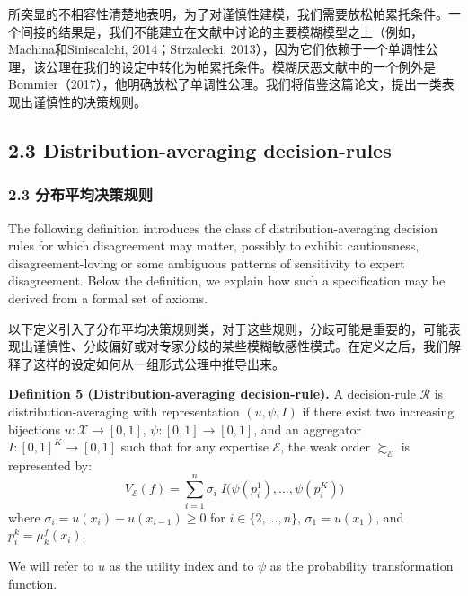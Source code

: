 \documentclass[12pt,a4paper]{article}
\newenvironment{original}
  {\par\noindent\ignorespaces}
  {\par}
\newenvironment{translation}
  {\par\noindent{\color{transblue}\ignorespaces}}
  {\par\medskip}
\begin{document}
\begin{translation}
所突显的不相容性清楚地表明，为了对谨慎性建模，我们需要放松帕累托条件。一个间接的结果是，我们不能建立在文献中讨论的主要模糊模型之上（例如，Machina和Siniscalchi, 2014；Strzalecki, 2013），因为它们依赖于一个单调性公理，该公理在我们的设定中转化为帕累托条件。模糊厌恶文献中的一个例外是Bommier（2017），他明确放松了单调性公理。我们将借鉴这篇论文，提出一类表现出谨慎性的决策规则。
\end{translation}

\subsection{2.3 Distribution-averaging decision-rules}
{\color{transblue}\subsubsection*{2.3 分布平均决策规则}}

\begin{original}
The following definition introduces the class of distribution-averaging decision rules for which disagreement may matter, possibly to exhibit cautiousness, disagreement-loving or some ambiguous patterns of sensitivity to expert disagreement. Below the definition, we explain how such a specification may be derived from a formal set of axioms.
\end{original}

\begin{translation}
以下定义引入了分布平均决策规则类，对于这些规则，分歧可能是重要的，可能表现出谨慎性、分歧偏好或对专家分歧的某些模糊敏感性模式。在定义之后，我们解释了这样的设定如何从一组形式公理中推导出来。
\end{translation}

\begin{original}
\textbf{Definition 5 (Distribution-averaging decision-rule).} A decision-rule $\mathcal{R}$ is distribution-averaging with representation $(u, \psi, I)$ if there exist two increasing bijections $u: \mathcal{X} \to [0,1]$, $\psi: [0,1] \to [0,1]$, and an aggregator $I: [0,1]^{K} \to [0,1]$ such that for any expertise $\mathcal{E}$, the weak order $\succsim_{\mathcal{E}}$ is represented by:
\[
V_{\mathcal{E}}(f) = \sum_{i=1}^{n} \sigma_{i} \; I\!\big(\psi(p^{1}_{i}), \dots, \psi(p^{K}_{i})\big) \tag{6}
\]
where $\sigma_{i} = u(x_{i}) - u(x_{i-1}) \geq 0$ for $i \in \{2, \dots, n\}$, $\sigma_{1} = u(x_{1})$, and $p^{k}_{i} = \mu_{k}^{f}(x_{i})$.

We will refer to $u$ as the utility index and to $\psi$ as the probability transformation function.
\end{original}
\end{document}
